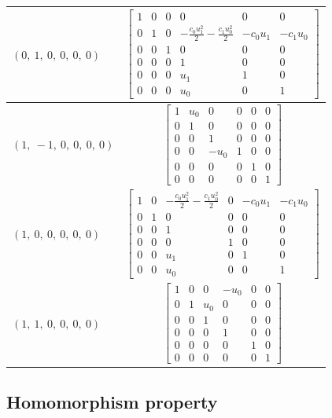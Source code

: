\documentclass[11pt]{article}
\theoremstyle{definition}
\begin{document}
\begin{longtable}{|l|c|}
    \hline
    $\left( 0, \  1, \  0, \  0, \  0, \  0\right)$ & ${\left[\begin{matrix}1 & 0 & 0 & 0 & 0 & 0\\0 & 1 & 0 & - \frac{c_{0} u_{1}^{2}}{2} - \frac{c_{1} u_{0}^{2}}{2} & - c_{0} u_{1} & - c_{1} u_{0}\\0 & 0 & 1 & 0 & 0 & 0\\0 & 0 & 0 & 1 & 0 & 0\\0 & 0 & 0 & u_{1} & 1 & 0\\0 & 0 & 0 & u_{0} & 0 & 1\end{matrix}\right]}$ \\
    \hline
    $\left( 1, \  -1, \  0, \  0, \  0, \  0\right)$ & ${\left[\begin{matrix}1 & u_{0} & 0 & 0 & 0 & 0\\0 & 1 & 0 & 0 & 0 & 0\\0 & 0 & 1 & 0 & 0 & 0\\0 & 0 & - u_{0} & 1 & 0 & 0\\0 & 0 & 0 & 0 & 1 & 0\\0 & 0 & 0 & 0 & 0 & 1\end{matrix}\right]}$ \\
    \hline
    $\left( 1, \  0, \  0, \  0, \  0, \  0\right)$ & ${\left[\begin{matrix}1 & 0 & - \frac{c_{0} u_{1}^{2}}{2} - \frac{c_{1} u_{0}^{2}}{2} & 0 & - c_{0} u_{1} & - c_{1} u_{0}\\0 & 1 & 0 & 0 & 0 & 0\\0 & 0 & 1 & 0 & 0 & 0\\0 & 0 & 0 & 1 & 0 & 0\\0 & 0 & u_{1} & 0 & 1 & 0\\0 & 0 & u_{0} & 0 & 0 & 1\end{matrix}\right]}$ \\
    \hline
    $\left( 1, \  1, \  0, \  0, \  0, \  0\right)$ & ${\left[\begin{matrix}1 & 0 & 0 & - u_{0} & 0 & 0\\0 & 1 & u_{0} & 0 & 0 & 0\\0 & 0 & 1 & 0 & 0 & 0\\0 & 0 & 0 & 1 & 0 & 0\\0 & 0 & 0 & 0 & 1 & 0\\0 & 0 & 0 & 0 & 0 & 1\end{matrix}\right]}$ \\
    \hline
\end{longtable}


\subsection{Homomorphism property}
\end{document}
